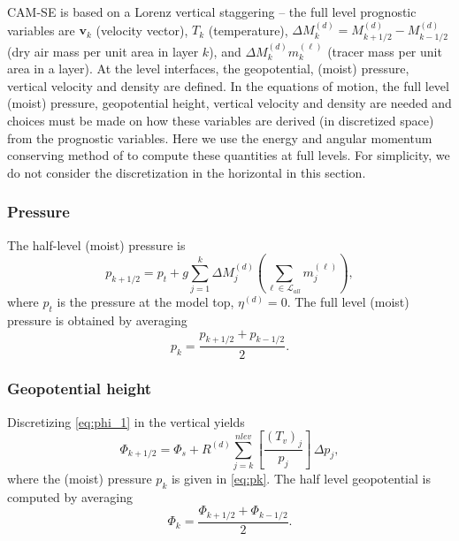\documentclass{agujournal}
\begin{document}
{CAM-SE is based on a Lorenz vertical staggering -- the full level prognostic variables are $\mathbf{v}_k$ (velocity vector), $T_k$ (temperature), $\Delta M^{(d)}_k=M^{(d)}_{k+1/2}-M^{(d)}_{k-1/2}$ (dry air mass per unit area in layer $k$), and $\Delta M^{(d)}_k m_k^{(\ell)}$ (tracer mass per unit area in a layer). At the level interfaces, the geopotential, (moist) pressure, vertical velocity and density are defined. In the equations of motion, the full level (moist) pressure, geopotential height, vertical velocity and density are needed and choices must be made on how these variables are derived (in discretized space) from the prognostic variables. Here we use the energy and angular momentum conserving method of \citet{SB1981MWR} to compute these quantities at full levels. For simplicity, we do not consider the discretization in the horizontal in this section.
\subsubsection{Pressure}\label{sec:pk}
The half-level (moist) pressure is
\begin{equation}
p_{k+1/2}=p_t+g\sum_{j=1}^{k}\Delta M^{(d)}_j \left(\sum_{\ell \in \mathcal{L}_{all}} m_j^{(\ell)}\right),\label{eq:halfpfull}
\end{equation}
where $p_t$ is the pressure at the model top, $\eta^{(d)}=0$.
The full level (moist) pressure is obtained by averaging \citep{SB1981MWR}
\begin{equation}
p_k=\frac{p_{k+1/2}+p_{k-1/2}}{2}.\label{eq:pk}
\end{equation}
\subsubsection{Geopotential height}
Discretizing \eqref{eq:phi_1} in the vertical yields
\begin{equation}
\Phi_{k+1/2}=\Phi_s+R^{(d)}\sum_{j=k}^{nlev} \left[ \frac{(T_v)_j}{p_j}\right]\, \Delta p_j,
\end{equation}
where the (moist) pressure $p_k$ is given in \eqref{eq:pk}. The half level geopotential is computed by averaging
\begin{equation}
\Phi_k=\frac{\Phi_{k+1/2}+\Phi_{k-1/2}}{2}.
\end{equation}
}
\end{document}
